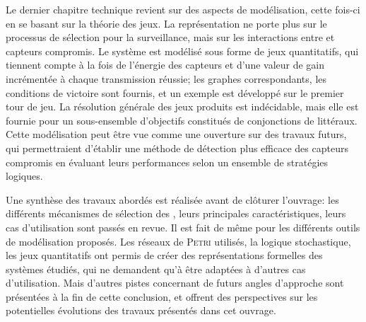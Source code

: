 Le dernier chapitre technique revient sur des aspects de modélisation, cette fois-ci en se basant sur la théorie des jeux.
La représentation ne porte plus sur le processus de sélection pour la surveillance, mais sur les interactions entre \cnst et capteurs compromis.
Le système est modélisé sous forme de jeux quantitatifs, qui tiennent compte à la fois de l'énergie des capteurs et d'une valeur de gain incrémentée à chaque transmission réussie; les graphes correspondants, les conditions de victoire sont fournis, et un exemple est développé sur le premier tour de jeu.
La résolution générale des jeux produits est indécidable, mais elle est fournie pour un sous-ensemble d'objectifs constitués de conjonctions de littéraux.
Cette modélisation peut être vue comme une ouverture sur des travaux futurs, qui permettraient d'établir une méthode de détection plus efficace des capteurs compromis en évaluant leurs performances selon un ensemble de stratégies logiques.

Une synthèse des travaux abordés est réalisée avant de clôturer l'ouvrage: les différents mécanismes de sélection des \cnst, leurs principales caractéristiques, leurs cas d'utilisation sont passés en revue.
Il est fait de même pour les différents outils de modélisation proposés.
Les réseaux de \textsc{Petri} utilisés, la logique stochastique, les jeux quantitatifs ont permis de créer des représentations formelles des systèmes étudiés, qui ne demandent qu'à être adaptées à d'autres cas d'utilisation.
Mais d'autres pistes concernant de futurs angles d'approche sont présentées à la fin de cette conclusion, et offrent des perspectives sur les potentielles évolutions des travaux présentés dans cet ouvrage.

